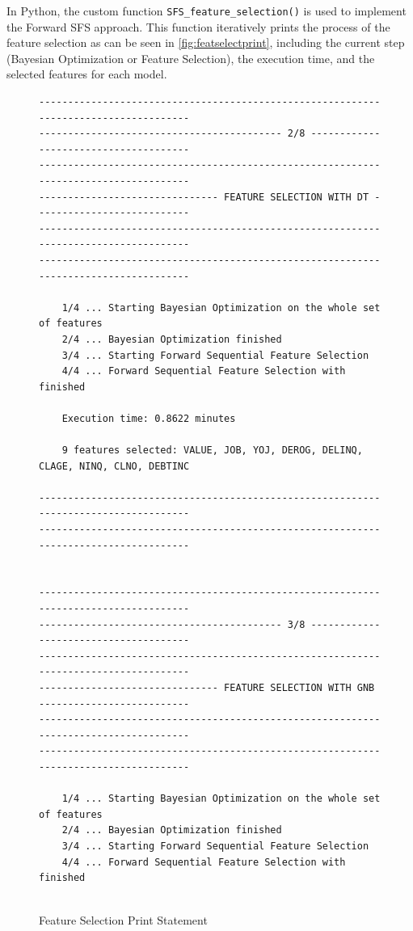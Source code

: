 In Python, the custom function \lstinline{SFS_feature_selection()} is used to implement the Forward SFS approach.
This function iteratively prints the process of the feature selection as can be seen in \autoref{fig:featselectprint}, including the current step (Bayesian Optimization or Feature Selection), the execution time, and the selected features for each model.

\begin{figure}[H]
    \centering\caption{Feature Selection Print Statement}
    \label{fig:featselectprint}

{\fontsize{8.8}{11}\selectfont 
\begin{verbatim}
-------------------------------------------------------------------------------------
------------------------------------------ 2/8 --------------------------------------
-------------------------------------------------------------------------------------
------------------------------- FEATURE SELECTION WITH DT ---------------------------
-------------------------------------------------------------------------------------
------------------------------------------------------------------------------------- 
  
    1/4 ... Starting Bayesian Optimization on the whole set of features
    2/4 ... Bayesian Optimization finished
    3/4 ... Starting Forward Sequential Feature Selection
    4/4 ... Forward Sequential Feature Selection with finished 
    
    Execution time: 0.8622 minutes 
    
    9 features selected: VALUE, JOB, YOJ, DEROG, DELINQ, CLAGE, NINQ, CLNO, DEBTINC 
    
-------------------------------------------------------------------------------------
------------------------------------------------------------------------------------- 
   
    
-------------------------------------------------------------------------------------
------------------------------------------ 3/8 --------------------------------------
-------------------------------------------------------------------------------------
------------------------------- FEATURE SELECTION WITH GNB --------------------------
-------------------------------------------------------------------------------------
------------------------------------------------------------------------------------- 
    
    1/4 ... Starting Bayesian Optimization on the whole set of features
    2/4 ... Bayesian Optimization finished
    3/4 ... Starting Forward Sequential Feature Selection
    4/4 ... Forward Sequential Feature Selection with finished 
    

\end{verbatim}}
\end{figure}
